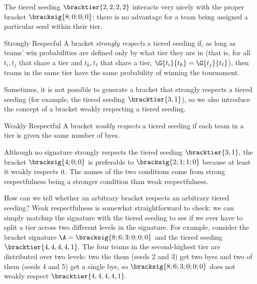 {    The tiered seeding $\bracktier{2,2,2,2}$ interacts very nicely with the proper bracket $\bracksig{8;0;0;0}$: there is no advantage for a team being assigned a particular seed within their tier.

    \begin{definition}{Strongly Respecful}{}
        A bracket \textit{strongly respects} a tiered seeding if, as long as teams' win probabilities are defined only by what tier they are in (that is, for all $t_i, t_j$ that share a tier and $t_k, t_\ell$ that share a tier, $\G{t_i}{t_k} = \G{t_j}{t_\ell}$), then teams in the same tier have the same probability of winning the tournament.
    \end{definition}

    Sometimes, it is not possible to generate a bracket that strongly respects a tiered seeding (for example, the tiered seeding $\bracktier{3, 1}$), so we also introduce the concept of a bracket weakly respecting a tiered seeding.

    \begin{definition}{Weakly Respectful}{}
        A bracket \textit{weakly respects} a tiered seeding if each team in a tier is given the same number of byes.
    \end{definition}

    Although no signature strongly respects the tiered seeding $\bracktier{3, 1},$ the bracket $\bracksig{4;0;0}$ is preferable to $\bracksig{2;1;1;0}$ because at least it weakly respects it. The names of the two conditions come from strong respectfulness being a stronger condition than weak respectfulness.



    How can we tell whether an arbitrary bracket respects an arbitrary tiered seeding? Weak respectfulness is somewhat straightforward to check: we can simply matchup the signature with the tiered seeding to see if we ever have to split a tier across two different levels in the signature. For example, consider the bracket signature $\A = \bracksig{8;6;3;0;0;0}$ and the tiered seeding $\bracktier{4,4,4,4,1}.$ The four teams in the second-highest tier are distributed over two levels: two the them (seeds 2 and 3) get two byes and two of them (seeds 4 and 5) get a single bye, so $\bracksig{8;6;3;0;0;0}$ does not weakly respect $\bracktier{4,4,4,4,1}.$

}
